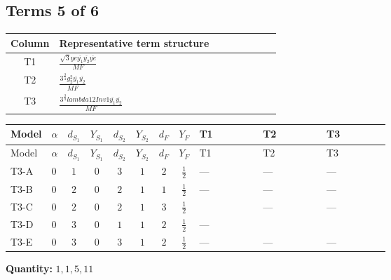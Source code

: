 \documentclass[8pt]{article}
\begin{document}
\begin{landscape}
\subsection*{Terms 5 of 6}
\begin{center}
\begin{tabular}{@{}c >{\raggedright\arraybackslash}p{0.82\linewidth}@{}}
\toprule
Column & Representative term structure \\
\midrule
T1 & \(\displaystyle \frac{\sqrt{3} ye \overline{y_{1}} \overline{y_{2}} \overline{ye}}{MF}\) \\
\midrule
T2 & \(\displaystyle \frac{3^{\frac{3}{4}} g_{2}^{2} \overline{y_{1}} \overline{y_{2}}}{MF}\) \\
\midrule
T3 & \(\displaystyle \frac{3^{\frac{3}{4}} lambda12Inv1 \overline{y_{1}} \overline{y_{2}}}{MF}\) \\
\midrule
\bottomrule
\end{tabular}
\end{center}
\smallskip
\tiny
\begin{longtable}{@{}llcccccc >{\raggedright\arraybackslash}p{0.21\linewidth} >{\raggedright\arraybackslash}p{0.21\linewidth} >{\raggedright\arraybackslash}p{0.21\linewidth}@{}}
\toprule
Model & $\alpha$ & $d_{S_1}$ & $Y_{S_1}$ & $d_{S_2}$ & $Y_{S_2}$ & $d_F$ & $Y_F$ & T1 & T2 & T3 \\
\midrule
\endfirsthead
\toprule
Model & $\alpha$ & $d_{S_1}$ & $Y_{S_1}$ & $d_{S_2}$ & $Y_{S_2}$ & $d_F$ & $Y_F$ & T1 & T2 & T3 \\
\midrule
\endhead
T3-A & $0$ & $1$ & $0$ & $3$ & $1$ & $2$ & $\frac{1}{2}$ & --- & --- & --- \\
\midrule
T3-B & $0$ & $2$ & $0$ & $2$ & $1$ & $1$ & $\frac{1}{2}$ & --- & --- & --- \\
\midrule
T3-C & $0$ & $2$ & $0$ & $2$ & $1$ & $3$ & $\frac{1}{2}$ & \scriptsize\adjustbox{max width=\linewidth}{$\begin{gathered} - \frac{\sqrt{3} ye \overline{y_{1}} \overline{y_{2}} \overline{ye}}{12 MF}\end{gathered}$} & --- & --- \\
\midrule
T3-D & $0$ & $3$ & $0$ & $1$ & $1$ & $2$ & $\frac{1}{2}$ & --- & \scriptsize\adjustbox{max width=\linewidth}{$\begin{gathered} - \frac{17 \cdot 3^{\frac{3}{4}} g_{2}^{2} \overline{y_{1}} \overline{y_{2}}}{24 MF}\end{gathered}$} & \scriptsize\adjustbox{max width=\linewidth}{$\begin{gathered} - \frac{3^{\frac{3}{4}} lambda12Inv1 \overline{y_{1}} \overline{y_{2}}}{6 MF}\end{gathered}$} \\
\midrule
T3-E & $0$ & $3$ & $0$ & $3$ & $1$ & $2$ & $\frac{1}{2}$ & --- & --- & --- \\
\midrule
\bottomrule
\end{longtable}
\clearpage
\noindent\textbf{Quantity: }$\mathrm{1,1,5,11}$\par\smallskip

\end{landscape}
\end{document}
